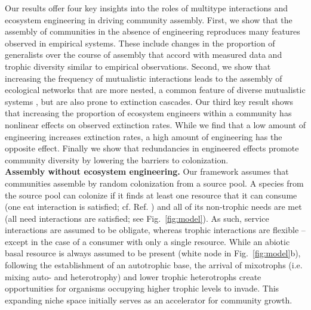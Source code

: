 \documentclass[twocolumn,preprintnumbers,amsmath,amssymb,superscriptaddress,linenumbers]{revtex4-1}
\begin{document}
Our results offer four key insights into the roles of multitype interactions and ecosystem engineering in driving community assembly.
First, we show that the assembly of communities in the absence of engineering reproduces many features observed in empirical systems.
These include changes in the proportion of generalists over the course of assembly that accord with measured data and trophic diversity similar to empirical observations. %
Second, we show that increasing the frequency of mutualistic interactions leads to the assembly of ecological networks that are more nested, a common feature of diverse mutualistic systems \cite{Bascompte2003}, but are also prone to extinction cascades.
Our third key result shows that increasing the proportion of ecosystem engineers within a community has nonlinear effects on observed extinction rates.
While we find that a low amount of engineering increases extinction rates, a high amount of engineering has the opposite effect.
Finally we show that redundancies in engineered effects promote community diversity by lowering the barriers to colonization.\\

\vspace{0mm}
\noindent \textbf{Assembly without ecosystem engineering.}
\noindent Our framework assumes that communities assemble by random colonization from a source pool.
A species from the source pool can colonize if it finds at least one resource that it can consume (one eat interaction is satisfied; cf. Ref. \cite{Gravel2011}) and all of its non-trophic needs are met (all need interactions are satisfied; see Fig.\ \ref{fig:model}).
As such, service interactions are assumed to be obligate, whereas trophic interactions are flexible -- except in the case of a consumer with only a single resource.
While an abiotic basal resource is always assumed to be present (white node in Fig.\ \ref{fig:model}b), following the establishment of an autotrophic base, the arrival of mixotrophs (i.e. mixing auto- and heterotrophy) and lower trophic heterotrophs create opportunities for organisms occupying higher trophic levels to invade.
This expanding niche space initially serves as an accelerator for community growth.
\end{document}
